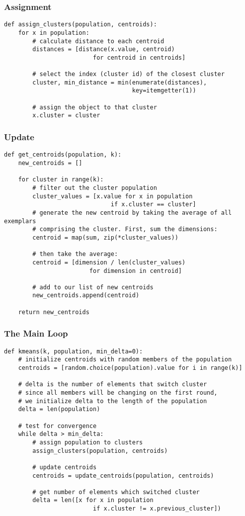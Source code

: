 \documentclass{beamer}
\begin{document}
\begin{frame}[fragile]
\frametitle{Assignment}
\begin{verbatim}
def assign_clusters(population, centroids):
    for x in population:
        # calculate distance to each centroid
        distances = [distance(x.value, centroid) 
                         for centroid in centroids]

        # select the index (cluster id) of the closest cluster
        cluster, min_distance = min(enumerate(distances), 
                                    key=itemgetter(1))

        # assign the object to that cluster
        x.cluster = cluster
\end{verbatim}
\end{frame}

\begin{frame}[fragile]
\frametitle{Update}
\begin{verbatim}
def get_centroids(population, k):
    new_centroids = []

    for cluster in range(k): 
        # filter out the cluster population
        cluster_values = [x.value for x in population 
                              if x.cluster == cluster]
        # generate the new centroid by taking the average of all exemplars
        # comprising the cluster. First, sum the dimensions:
        centroid = map(sum, zip(*cluster_values))

        # then take the average:
        centroid = [dimension / len(cluster_values) 
                        for dimension in centroid]  

        # add to our list of new centroids
        new_centroids.append(centroid)
   
    return new_centroids
\end{verbatim}
\end{frame}

\begin{frame}[fragile]
\frametitle{The Main Loop}
\begin{verbatim}
def kmeans(k, population, min_delta=0):
    # initialize centroids with random members of the population
    centroids = [random.choice(population).value for i in range(k)]
   
    # delta is the number of elements that switch cluster
    # since all members will be changing on the first round,
    # we initialize delta to the length of the population
    delta = len(population)

    # test for convergence
    while delta > min_delta:
        # assign population to clusters
        assign_clusters(population, centroids)

        # update centroids
        centroids = update_centroids(population, centroids)
        
        # get number of elements which switched cluster
        delta = len([x for x in population 
                         if x.cluster != x.previous_cluster])
\end{verbatim}
\end{frame}
\end{document}
